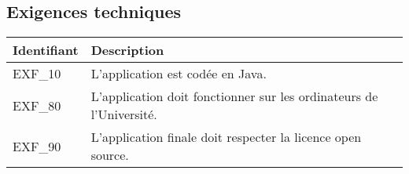 \documentclass[hidelinks, 10pt,a4paper]{article}
\begin{document}
  \subsection{Exigences techniques}
    \begin{center}
      \begin{tabular}{|l|p{10cm}|}
	\hline{\textbf{Identifiant}} & {\textbf{Description}}\\\hline
	{EXF\_10} & {L’application est codée en Java.}\\\hline
	{EXF\_80} & {L’application doit fonctionner sur les ordinateurs de l’Université.}\\\hline
	{EXF\_90} & {L’application finale doit respecter la licence open source.}\\\hline
      \end{tabular}
    \end{center}
\end{document}
